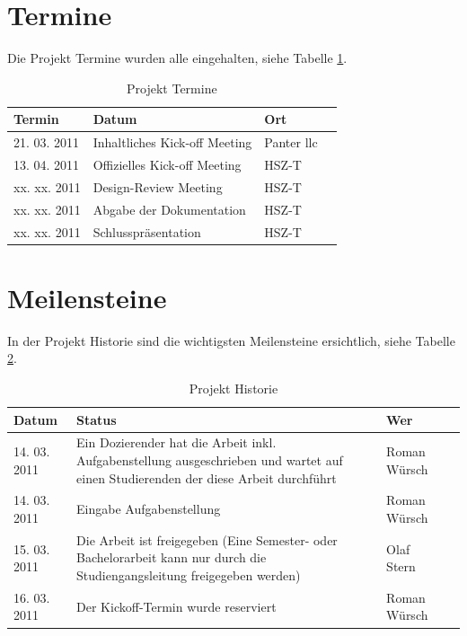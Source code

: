   \section{Termine}
  
  Die Projekt Termine wurden alle eingehalten, siehe Tabelle \ref{tab:termine}.
  \newline
  
  \begin{table}[ht]
    \begin{center}
      \begin{tabular}{lp{7cm}ll}
        \toprule
        Termin & Datum & Ort \\
        \midrule
        21. 03. 2011 & Inhaltliches Kick-off Meeting & Panter llc\\
        13. 04. 2011 & Offizielles Kick-off Meeting & HSZ-T\\
        xx. xx. 2011 & Design-Review Meeting & HSZ-T\\
        xx. xx. 2011 & Abgabe der Dokumentation & HSZ-T\\
        xx. xx. 2011 & Schlusspräsentation & HSZ-T\\
        \bottomrule
      \end{tabular}
      \caption{Projekt Termine}
      \label{tab:termine}
    \end{center}
  \end{table}
  
  \section{Meilensteine}
  
  In der Projekt Historie sind die wichtigsten Meilensteine ersichtlich, siehe
  Tabelle \ref{tab:projekthistorie}.
  \newline
  
  \begin{table}[ht]
    \begin{center}
      \begin{tabular}{lp{7cm}ll}
        \toprule
        Datum & Status & Wer \\
        \midrule
        14. 03. 2011 & Ein Dozierender hat die Arbeit inkl. Aufgabenstellung
        ausgeschrieben und wartet auf einen Studierenden der  diese Arbeit
        durchführt & Roman Würsch\\
        14. 03. 2011 & Eingabe Aufgabenstellung & Roman Würsch\\
        15. 03. 2011 & Die Arbeit ist freigegeben (Eine Semester- oder
        Bachelorarbeit kann nur durch die Studiengangsleitung freigegeben
        werden) & Olaf Stern\\
        16. 03. 2011 & Der Kickoff-Termin wurde reserviert & Roman Würsch\\
        \bottomrule
      \end{tabular}
      \caption{Projekt Historie}
      \label{tab:projekthistorie}
    \end{center}
  \end{table}
  
